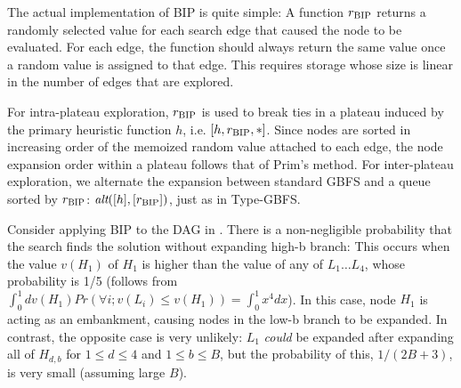 The actual implementation of BIP is quite simple:
A %
function $r_\text{BIP}$ returns a randomly selected value 
for each search edge that caused the node to be evaluated.
For each edge, the function should always return the same value  once a random value is assigned to that edge. This requires storage whose size is linear in the number of edges that are explored.


For intra-plateau exploration, $r_\text{BIP}$ is used to break ties in a plateau induced by the primary heuristic function $h$, i.e. $[h,r_\text{BIP},*]$.
Since nodes are sorted in increasing order of the memoized random value attached to each edge, the node expansion order within a plateau follows that of Prim's method.
For inter-plateau exploration, we alternate the expansion between standard GBFS and a queue sorted by $r_\text{BIP}$: $\textit{alt}([h],[r_\text{BIP}])$, just as in Type-GBFS.


Consider applying BIP to the DAG in .
There is a non-negligible probability that the search finds the solution without expanding high-b branch:
This occurs when the value $v(H_1)$ of $H_1$ is higher than the value of any of $L_1\ldots L_4$,
whose probability is 1/5
 (follows from $\int_0^1 dv(H_1) Pr(\forall i; v(L_i)\leq v(H_1)) = \int_0^1 x^4dx$). 
In this case, node $H_1$ is acting as an embankment, causing nodes in the  low-b branch to be expanded.
In contrast, the opposite case is very unlikely:
$L_1$ \emph{could} be expanded after expanding all of $H_{d,b}$ for $1\leq d\leq 4$ and $1\leq b \leq B$,
 but the probability of this,  $1/(2B+3)$,  is very small (assuming large $B$).

